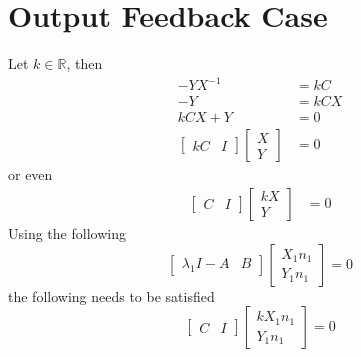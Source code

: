 \section{Output Feedback Case}
Let $k\in\mathbb{R}$, then
\begin{equation}
\begin{split}
    -YX^{-1}&=kC\\
    -Y&=kCX\\
    kCX+Y&=0\\
    \begin{bmatrix}
        kC&I
    \end{bmatrix}\begin{bmatrix}
        X\\Y
    \end{bmatrix}&=0
\end{split}
\end{equation}
or even 
\begin{equation}
    \begin{split}
        \begin{bmatrix}
            C&I
        \end{bmatrix}\begin{bmatrix}
            kX\\Y
        \end{bmatrix}&=0
    \end{split}
\end{equation}
Using the following 
\begin{equation}
    \begin{bmatrix}
        \lambda_1 I-A& B
    \end{bmatrix}\begin{bmatrix}
        X_1n_1\\Y_1n_1
    \end{bmatrix}=0
\end{equation}
the following needs to be satisfied
\begin{equation}
    \begin{bmatrix}
        C& I
    \end{bmatrix}\begin{bmatrix}
        kX_1n_1\\Y_1n_1
    \end{bmatrix}=0
\end{equation}

